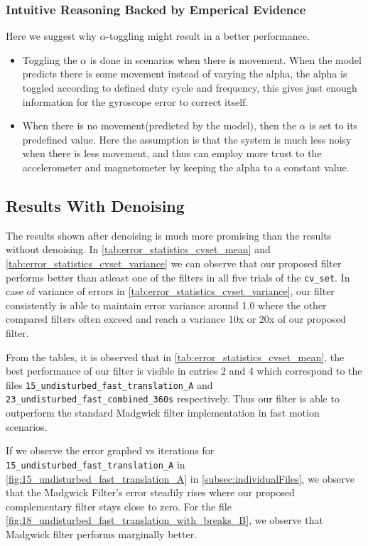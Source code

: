 \documentclass{iutbscthesis}
\begin{document}
\subsubsection{Intuitive Reasoning Backed by Emperical Evidence}
Here we suggest why $\alpha$-toggling might result in a better performance.
\begin{itemize}
    \item Toggling the $\alpha$ is done in scenarios when there is movement. When the model predicts there is some movement 
    instead of varying the alpha, the alpha is toggled according to defined duty cycle and frequency, this gives just enough information for the gyroscope error to correct itself.
    \item When there is no movement(predicted by the model), then the $\alpha$ is set to its predefined value. Here the assumption is that the system is much less noisy when there is less movement, and thus can employ more trust to the accelerometer and magnetometer by keeping the alpha to a constant value.
\end{itemize}


\subsection{Results With Denoising}

The results shown after denoising is much more promising than the results without denoising. In 
\autoref{tab:error_statistics_cvset_mean} and \autoref{tab:error_statistics_cvset_variance} we can observe 
that our proposed filter performs better than atleast one of the filters in all five trials of the \texttt{cv\_set}.
In case of variance of errors in \autoref{tab:error_statistics_cvset_variance}, our filter consistently is able to maintain error variance around 1.0 where the other compared 
filters often exceed and reach a variance 10x or 20x of our proposed filter.

From the tables, it is observed that in \autoref{tab:error_statistics_cvset_mean}, the best performance of
our filter is visible in entries 2 and 4 which correspond to the files \texttt{15\_undisturbed\_fast\_translation\_A} and \texttt{23\_undisturbed\_fast\_combined\_360s} respectively.
Thus our filter is able to outperform the standard Madgwick filter implementation in fast motion scenarios.

If we observe the error graphed vs iterations for \texttt{15\_undisturbed\_fast\_translation\_A} in \autoref{fig:15_undisturbed_fast_translation_A} in \autoref{subsec:individualFiles}, we observe that the
Madgwick Filter's error steadily rises where our proposed complementary filter stays close to zero. For the file \autoref{fig:18_undisturbed_fast_translation_with_breaks_B},
we observe that Madgwick filter performs marginally better.
\end{document}
